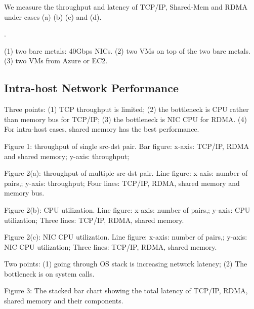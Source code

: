 We measure the throughput and latency of TCP/IP, Shared-Mem and RDMA under cases
(a) (b) (c) and (d).

.


(1) two bare metals: 40Gbps NICs.
(2) two VMs on top of the two bare metals.
(3) two VMs from Azure or EC2.

\subsection{Intra-host Network Performance}


Three points: (1) TCP throughput is limited; (2) the bottleneck is CPU rather than memory bus for TCP/IP; (3) the bottleneck is NIC CPU for RDMA. (4) For intra-host cases, shared memory has the best performance.

Figure 1: throughput of single src-dst pair. Bar figure: x-axis: TCP/IP, RDMA and shared memory; y-axis: throughput;

Figure 2(a): throughput of multiple src-dst pair. Line figure: x-axis: number of pairs,; y-axis: throughput; Four lines: TCP/IP, RDMA, shared memory and memory bus.

Figure 2(b): CPU utilization. Line figure: x-axis: number of pairs,; y-axis: CPU utilization; Three lines: TCP/IP, RDMA, shared memory.

Figure 2(c): NIC CPU utilization. Line figure: x-axis: number of pairs,; y-axis: NIC CPU utilization; Three lines: TCP/IP, RDMA, shared memory.


Two points: (1) going through OS stack is increasing network latency; (2) The bottleneck is on system calls.

Figure 3: The stacked bar chart showing the total latency of TCP/IP, RDMA, shared memory and their components.